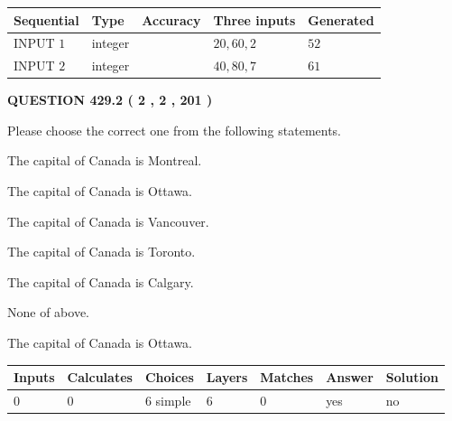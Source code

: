 \documentclass[12pt]{article}
\begin{document}
  
\noindent\begin{tabular}{|l|l|l|l|l|}
\hline
 Sequential & Type & Accuracy & Three inputs & Generated \\ 
\hline
 
 
  INPUT $  1 $ & integer &  & $
 20
 , 
 60
 , 
 2
 $ & $ 52 $ 
 \\  \hline  
 
 
  INPUT $  2 $ & integer &  & $
 40
 , 
 80
 , 
 7
 $ & $ 61 $ 
 \\  \hline  
 \end{tabular}
   
   
  
\vspace{0.2in}
  
{\textbf{\Large{QUESTION
429.2 
 ( 2 , 2 , 201 )
}}}
  
  
Please choose the correct one from the following statements.
 
 
The capital of Canada is Montreal.
 
 
The capital of Canada is Ottawa.
 
 
The capital of Canada is Vancouver.
 
 
The capital of Canada is Toronto.
 
 
The capital of Canada is Calgary.
 
 
 None of above.
 
 
\noindent{}
 
 
The capital of Canada is Ottawa.
 
 
\noindent{}
 
 
   
   
   
   
\noindent\begin{tabular}{|l|l|l|l|l|l|l|}
 \hline
Inputs & Calculates & Choices & Layers & Matches & Answer & Solution \\ \hline
 0  & 
 0  & 
 6
  simple  
  & 
 6  & 
 0  & 
  yes & 
  no 
  \\ \hline
 \end{tabular}
   
   
   
\end{document}
